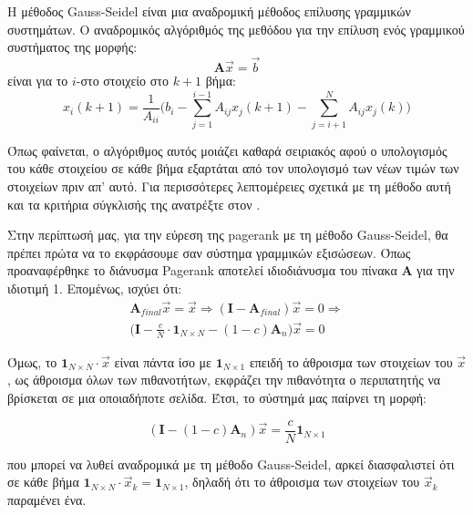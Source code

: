 H μέθοδος Gauss-Seidel είναι μια αναδρομική μέθοδος επίλυσης γραμμικών συστημάτων. Ο αναδρομικός αλγόριθμός της μεθόδου για την επίλυση ενός γραμμικού συστήματος της μορφής:
$$\bm{A}\vec{x}=\vec{b}$$
είναι για το $i$-στο στοιχείο στο $k+1$ βήμα:
$$x_i(k+1) = \frac{1}{A_{ii}}\bigg(b_i-\sum_{j=1}^{i-1}A_{ij}x_j(k+1)-\sum_{j=i+1}^{N}A_{ij}x_j(k)\bigg)$$

Όπως φαίνεται, ο αλγόριθμος αυτός μοιάζει καθαρά σειριακός αφού ο υπολογισμός του κάθε στοιχείου σε κάθε βήμα εξαρτάται από τον υπολογισμό των νέων τιμών των στοιχείων πριν απ' αυτό.
Για περισσότερες λεπτομέρειες σχετικά με τη μέθοδο αυτή και τα κριτήρια σύγκλισής της ανατρέξτε στον \textcite{saad2003iterative}.

Στην περίπτωσή μας, για την εύρεση της pagerank με τη μέθοδο Gauss-Seidel, θα πρέπει πρώτα να το εκφράσουμε σαν σύστημα γραμμικών εξισώσεων. Όπως προαναφέρθηκε το διάνυσμα Pagerank αποτελεί ιδιοδιάνυσμα του πίνακα $\bm{A}$ για την ιδιοτιμή 1. Επομένως, ισχύει ότι:\\
\begin{multline*}
\bm{A}_{final}\vec{x} = \vec{x}\Rightarrow (\bm{I}-\bm{A}_{final})\vec{x} = 0 
\Rightarrow \\
\bigg(\bm{I}-\frac{c}{N}\cdot\bm{1}_{N\times N}-(1-c)\bm{A}_n\bigg)\vec{x} = 0
\end{multline*}

Όμως, το $\bm{1}_{N\times N}\cdot\vec{x}$ είναι πάντα ίσο με $\bm{1}_{N\times1}$ επειδή το άθροισμα των στοιχείων του $\vec{x}$, ως άθροισμα όλων των πιθανοτήτων, εκφράζει την πιθανότητα ο περιπατητής να βρίσκεται σε μια οποιαδήποτε σελίδα.
 Έτσι, το σύστημά μας παίρνει τη μορφή:

\begin{equation} \label{eq1}
(\bm{I}-(1-c)\bm{A}_n)\vec{x} = \frac{c}{N}\bm{1}_{N\times1}
\end{equation}

που μπορεί να λυθεί αναδρομικά με τη μέθοδο Gauss-Seidel, αρκεί διασφαλιστεί ότι σε κάθε βήμα $\bm{1}_{N\times N}\cdot\vec{x}_k =\bm{1}_{N\times1}$, δηλαδή ότι το άθροισμα των στοιχείων του $\vec{x}_k$ παραμένει ένα.
